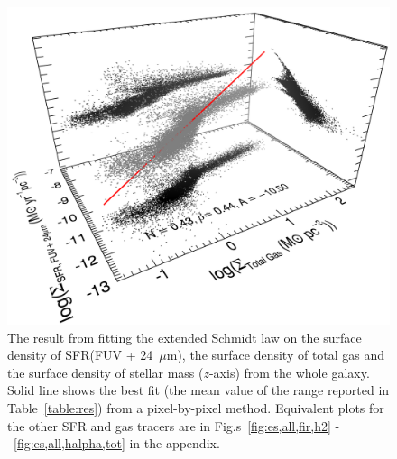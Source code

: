 \begin{figure}
        \centering
        \includegraphics[width=\textwidth]{../image_paper1/es_tot_fuv_vs_tot2_f.png}
        \caption[Result from fitting the extended Schmidt law on the M31 data of the whole galaxy]{The result from fitting the extended Schmidt law on the surface density of SFR(FUV + 24~$\mu$m), the surface density of total gas and the surface density of stellar mass ($z$-axis) from the whole galaxy. Solid line shows the best fit (the mean value of the range reported in Table~\ref{table:res}) from a pixel-by-pixel method. Equivalent plots for the other SFR and gas tracers are in Fig.s~\ref{fig:es,all,fir,h2} - ~\ref{fig:es,all,halpha,tot} in the appendix.}
        \label{fig:es,all,fuv,tot}
    \end{figure}

